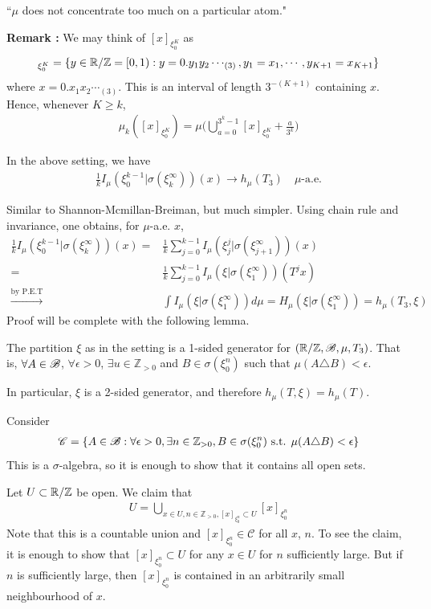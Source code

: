 \documentclass[12pt,a4paper]{report}
\newenvironment{proof}
{\begin{changemargin}{1cm}{0.5cm} 
	}%
	{\end{changemargin}
}
\newenvironment{subproof}
{\begin{changemargin}{0.5cm}{0.5cm}
	}%
	{\end{changemargin}
}
\begin{document}
``$\mu$ does not concentrate too much on a particular atom."
\s

\textbf{Remark :} We may think of $[x]_{\xi_0^K}$ as
\begin{align*}
[x]_{\xi_0^K} = \{ y\in \reals/\mathbb{Z} =[0,1) : y = 0.y_1y_2\cdots_{(3)}, y_1=x_1, \cdots, y_{K+1} = x_{K+1} \}
\end{align*}
where $x=0.x_1x_2 \cdots_{(3)}$. This is an interval of length $3^{-(K+1)}$ containing $x$. Hence, whenever $K\geq k$,
\begin{align*}
\mu_k([x]_{\xi_0^K}) = \mu \Big( \bigcup_{a=0}^{3^k-1} [x]_{\xi_0^K} + \frac{a}{3^k} \Big) 
\end{align*}
\s

\lem In the above setting, we have
\begin{align*}
\frac{1}{k}I_{\mu}(\xi_0^{k-1}|\sigma(\xi_k^{\infty}))(x) \rightarrow h_{\mu}(T_3) \quad \mu\text{-a.e.}
\end{align*}
\begin{proof}
\pf Similar to Shannon-Mcmillan-Breiman, but much simpler. Using chain rule and invariance, one obtains, for $\mu$-a.e. $x$,
\begin{align*}
\frac{1}{k}I_{\mu}(\xi_0^{k-1} | \sigma(\xi_k^{\infty}))(x) =& \frac{1}{k} \sum_{j=0}^{k-1} I_{\mu}(\xi_j^j | \sigma(\xi_{j+1}^{\infty}))(x) \\
=& \frac{1}{k} \sum_{j=0}^{k-1} I_{\mu}(\xi | \sigma(\xi_1^{\infty})) (T^j x) \\
\xrightarrow{\text{by P.E.T}} & \int I_{\mu}(\xi | \sigma(\xi_1^{\infty})) d\mu = H_{\mu}(\xi|\sigma(\xi^{\infty}_1))= h_{\mu}(T_3,\xi)
\end{align*}
Proof will be complete with the following lemma.
\begin{subproof}
\lem The partition $\xi$ as in the setting is a 1-sided generator for $(\mathbb{R}/ \mathbb{Z}, \mathscr{B}, \mu, T_3)$. That is, $\forall A \in \mathscr{B}$, $\forall \epsilon>0$, $\exists u \in \mathbb{Z}_{>0}$ and $B\in \sigma(\xi_0^n)$ such that $\mu(A \triangle B) < \epsilon$.

\quad In particular, $\xi$ is a 2-sided generator, and therefore $h_{\mu}(T,\xi) = h_{\mu}(T)$.

\pf Consider
\begin{align*}
\mathscr{C} = \{ A\in \mathscr{B} : \forall\epsilon >0, \exists n\in \mathbb{Z}_{>0},B\in \sigma(\xi_0^{n})\text{ s.t. } \mu(A\triangle B)<\epsilon \}
\end{align*}
This is a $\sigma$-algebra, so it is enough to show that it contains all open sets. 

\quad Let $U\subset \mathbb{R}/\mathbb{Z}$ be open. We claim that
\begin{align*}
U = \bigcup_{x\in U, n\in \mathbb{Z}_{>0}, [x]_{\xi_0^n} \subset U} [x]_{\xi_0^n}
\end{align*}
Note that this is a countable union and $[x]_{\xi_0^n} \in \mathscr{C}$ for all $x$, $n$. To see the claim, it is enough to show that $[x]_{\xi_0^n} \subset U$ for any $x\in U$ for $n$ sufficiently large. But if $n$ is sufficiently large, then $[x]_{\xi_0^n}$ is contained in an arbitrarily small neighbourhood of $x$.
\end{subproof}

\eop
\end{proof}
\end{document}
